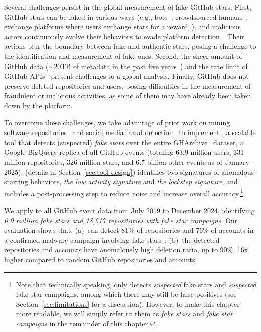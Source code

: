 Several challenges persist in the global measurement of fake GitHub stars.
First, GitHub stars can be faked in various ways (e.g., bots~\cite{stargazer-goblin}, crowdsourced humans~\cite{oceanbase}, exchange platforms where users exchange stars for a reward~\cite{DBLP:conf/acsac/DuYZDWH0020}), and malicious actors continuously evolve their behaviors to evade platform detection~\cite{DBLP:journals/tissec/IkramOFCFJKS17, DBLP:conf/www/CresciPPST17}.
Their actions blur the boundary between fake and authentic stars, posing a challenge to the identification and measurement of fake ones.
Second, the sheer amount of GitHub data ($\sim$20TB of metadata in the past five years~\cite{gharchive}) and the rate limit of GitHub APIs~\cite{github-rest-api} present challenges to a global analysis.
Finally, GitHub does not preserve deleted repositories and users, posing difficulties in the measurement of fraudulent or malicious activities, as some of them may have already been taken down by the platform.

To overcome these challenges, we take advantage of prior work on mining software repositories~\cite{gharchive} and social media fraud detection~\cite{DBLP:conf/www/BeutelXGPF13, DBLP:conf/www/CresciPPST17} to implement \SystemName, a scalable tool that detects (suspected) \emph{fake stars} over the entire \textsf{GHArchive}~\cite{gharchive} dataset, a Google BigQuery replica of all GitHub events (totaling 63.9 million users, 331 million repositories, 326 million stars, and 6.7 billion other events as of January 2025).
\SystemName (details in Section~\ref{sec:tool-design}) identifies two signatures of anomalous starring behaviors, \emph{the low activity signature} and \emph{the lockstep signature}, and includes a post-processing step to reduce noise and increase overall accuracy.\footnote{
Note that technically speaking, \SystemName only detects \emph{suspected} fake stars and \emph{suspected} fake star campaigns, among which there may still be false positives (see Section~\ref{sec:limitations} for a discussion).
However, to make this chapter more readable, we will simply refer to them as \emph{fake stars} and \emph{fake star campaigns} in the remainder of this chapter.
}

We apply \SystemName to all GitHub event data from July 2019 to  December 2024, identifying \emph{6.0 million fake stars and 18,617 repositories with fake star campaigns}.
Our evaluation shows that: (a)~\SystemName can detect 81\% of repositories and 76\% of accounts in a confirmed malware campaign involving fake stars~\cite{stargazer-goblin}; (b)~the detected repositories and accounts have anomalously high deletion ratio, up to 90\%, 16x higher compared to random GitHub repositories and accounts.

